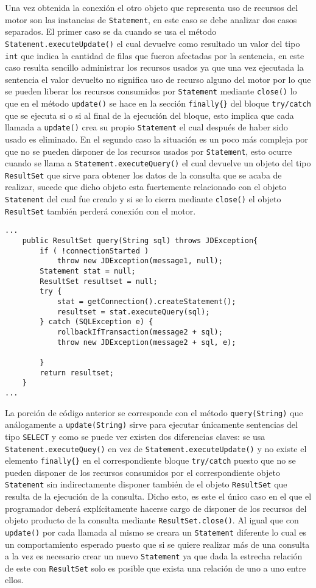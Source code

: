 Una vez obtenida la conexión el otro objeto que representa uso de recursos del motor son las instancias de \verb=Statement=, en este caso se debe analizar dos casos separados. El primer caso se da cuando se usa el método \verb=Statement.executeUpdate()= el cual devuelve como resultado un valor del tipo \verb=int= que indica la cantidad de filas que fueron afectadas por la sentencia, en este caso resulta sencillo administrar los recursos usados ya que una vez ejecutada la sentencia el valor devuelto no significa uso de recurso alguno del motor por lo que se pueden liberar los recursos consumidos por \verb=Statement= mediante \verb=close()= lo que en el método \verb=update()= se hace en la sección \verb=finally{}= del bloque \verb=try/catch= que se ejecuta si o si al final de la ejecución del bloque, esto implica que cada llamada a \verb=update()= crea su propio \verb=Statement= el cual después de haber sido usado es eliminado. En el segundo caso la situación es un poco más compleja por que no se pueden disponer de los recursos usados por \verb=Statement=, esto ocurre cuando se llama a \verb=Statement.executeQuery()= el cual devuelve un objeto del tipo \verb=ResultSet= que sirve para obtener los datos de la consulta que se acaba de realizar, sucede que dicho objeto esta fuertemente relacionado con el objeto \verb=Statement= del cual fue creado y si se lo cierra mediante \verb=close()= el objeto \verb=ResultSet= también perderá conexión con el motor.
%
\begin{lstlisting}[title=función extraída de JDBCManager]
...
	public ResultSet query(String sql) throws JDException{
		if ( !connectionStarted ) 
			throw new JDException(message1, null);
		Statement stat = null;
		ResultSet resultset = null;
		try {
			stat = getConnection().createStatement();
			resultset = stat.executeQuery(sql);
		} catch (SQLException e) {
			rollbackIfTransaction(message2 + sql);
			throw new JDException(message2 + sql, e);

		}
		return resultset;
	}
...
\end{lstlisting}
%
La porción de código anterior se corresponde con el método \verb=query(String)= que análogamente a \verb=update(String)= sirve para ejecutar únicamente sentencias del tipo \verb=SELECT= y como se puede ver existen dos diferencias claves: se usa \verb=Statement.executeQuey()= en vez de \verb=Statement.executeUpdate()= y no existe el elemento \verb=finally{}= en el correspondiente bloque \verb=try/catch= puesto que no se pueden disponer de los recursos consumidos por el correspondiente objeto \verb=Statement= sin indirectamente disponer también de el objeto \verb=ResultSet= que resulta de la ejecución de la consulta. Dicho esto, es este el único caso en el que el programador deberá explícitamente hacerse cargo de disponer de los recursos del objeto producto de la consulta mediante \verb=ResultSet.close()=. Al igual que con \verb=update()= por cada llamada al mismo se creara un \verb=Statement= diferente lo cual es un comportamiento esperado puesto que si se quiere realizar más de una consulta a la vez es necesario crear un nuevo \verb=Statement= ya que dada la estrecha relación de este con \verb=ResultSet= solo es posible que exista una relación de uno a uno entre ellos.


